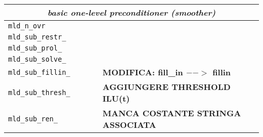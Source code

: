 \begin{sidewaystable}
\begin{center}
\begin{tabular}{|l|l|p{1.5cm}|l|p{6cm}|}
\multicolumn{5}{|c|}{\emph{basic one-level preconditioner (smoother)}}                                 \\ \hline
\verb|mld_n_ovr|         & 
                         & 
                         &
                         &     \\
\verb|mld_sub_restr_|    & 
                         & 
                         &
                         &     \\
\verb|mld_sub_prol_|     & 
                         & 
                         &
                         &     \\
\verb|mld_sub_solve_|    & 
                         & 
                         &
                         &     \\    
\verb|mld_sub_fillin_|   &
                         &
                         &
                         &     \textbf{MODIFICA: fill\_in $-->$ fillin} \\
\verb|mld_sub_thresh_|   &
                         &
                         &
                         &     \textbf{AGGIUNGERE THRESHOLD ILU(t)} \\
\verb|mld_sub_ren_|      &
                         &
                         &
                         &  \textbf{MANCA COSTANTE STRINGA ASSOCIATA}                                \\ \hline

                       \end{tabular}
                     \end{center}
                   \end{sidewaystable}                     
                   
